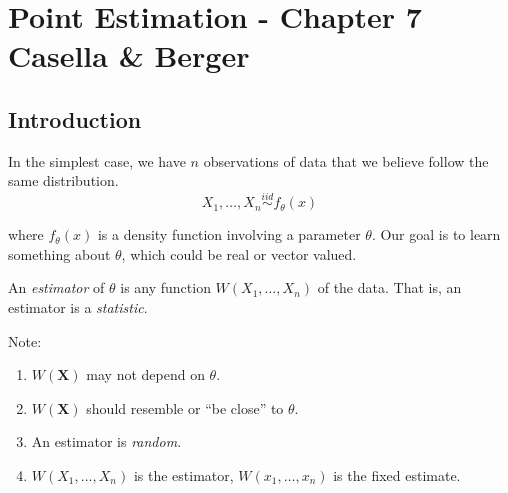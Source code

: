 \documentclass[11pt,fleqn]{book} %
\begin{document}
\pagestyle{empty} %

\tableofcontents %

\cleardoublepage %

\pagestyle{fancy} %



\chapter{Point Estimation - Chapter 7 Casella \& Berger}

\section{Introduction}

	In the simplest case, we have $n$ observations of data that we believe follow the same distribution.
	$$
		X_1, \dots, X_n \stackrel{iid}{\sim} f_\theta(x)
	$$

	where $f_\theta(x)$ is a density function involving a parameter $\theta$. Our goal is to learn something about $\theta$, which could be real or vector valued.\\

	\begin{definition}[Estimator]
		An \emph{estimator} of $\theta$ is any function $W(X_1, \dots, X_n)$ of the data. That is, an estimator is a \emph{statistic}.
	\end{definition}

	Note:
	\begin{enumerate}
		\item $W(\bm{X})$ may not depend on $\theta$.
		\item $W(\bm{X})$ should resemble or ``be close'' to $\theta$.
		\item An estimator is \emph{random}.
		\item $W(X_1, \dots, X_n)$ is the estimator, $W(x_1, \dots, x_n)$ is the fixed estimate.
	\end{enumerate}
\end{document}
